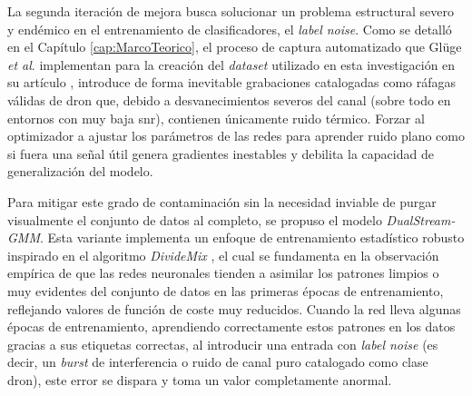 La segunda iteración de mejora busca solucionar un problema estructural severo y endémico en el entrenamiento de clasificadores, el \textit{label noise}. Como se detalló en el Capítulo \ref{cap:MarcoTeorico}, el proceso de captura automatizado que Glüge \textit{et al}. implementan para la creación del \textit{dataset} utilizado en esta investigación en su artículo \cite{gluge_robust_2024}, introduce de forma inevitable grabaciones catalogadas como ráfagas válidas de dron que, debido a desvanecimientos severos del canal (sobre todo en entornos con muy baja \gls{snr}), contienen únicamente ruido térmico. Forzar al optimizador a ajustar los parámetros de las redes para aprender ruido plano como si fuera una señal útil genera gradientes inestables y debilita la capacidad de generalización del modelo.

Para mitigar este grado de contaminación sin la necesidad inviable de purgar visualmente el conjunto de datos al completo, se propuso el modelo \textit{DualStream-GMM}. Esta variante implementa un enfoque de entrenamiento estadístico robusto inspirado en el algoritmo \textit{DivideMix} \cite{li_dividemix_2020}, el cual se fundamenta en la observación empírica de que las redes neuronales tienden a asimilar los patrones limpios o muy evidentes del conjunto de datos en las primeras épocas de entrenamiento, reflejando valores de función de coste muy reducidos. Cuando la red lleva algunas épocas de entrenamiento, aprendiendo correctamente estos patrones en los datos gracias a sus etiquetas correctas, al introducir una entrada con \textit{label noise} (es decir, un \textit{burst} de interferencia o ruido de canal puro catalogado como clase dron), este error se dispara y toma un valor completamente anormal.


